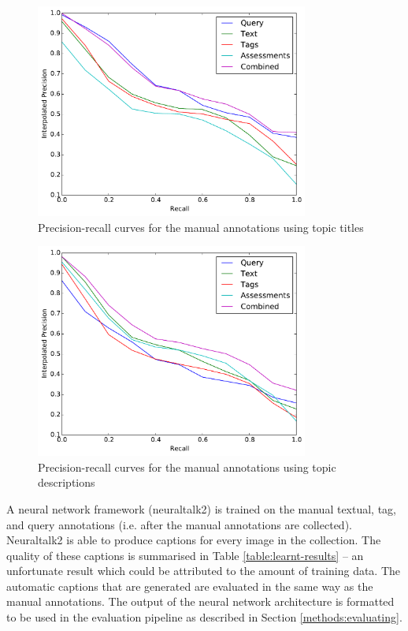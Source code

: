 \begin{figure}[ht]
    \centering
    \includegraphics[width=0.8\textwidth]{graphs/manual-title}
    \caption{Precision-recall curves for the manual annotations using topic titles}
    \label{fig:manual-result-title}
\end{figure}

\begin{figure}[ht]
    \centering
    \includegraphics[width=0.8\textwidth]{graphs/manual-desc}
    \caption{Precision-recall curves for the manual annotations using topic descriptions}
    \label{fig:manual-result-desc}
\end{figure}

\FloatBarrier

A neural network framework (neuraltalk2) is trained on the manual textual, tag, and query annotations (i.e. after the manual annotations are collected). Neuraltalk2 is able to produce captions for every image in the collection. The quality of these captions is summarised in Table \ref{table:learnt-results} -- an unfortunate result which could be attributed to the amount of training data. The automatic captions that are generated are evaluated in the same way as the manual annotations. The output of the neural network architecture is formatted to be used in the evaluation pipeline as described in Section \ref{methods:evaluating}. 

